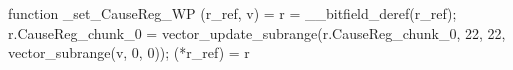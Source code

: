 function _set_CauseReg_WP (r_ref, v) = {
    r = __bitfield_deref(r_ref);
    r.CauseReg_chunk_0 = vector_update_subrange(r.CauseReg_chunk_0, 22, 22, vector_subrange(v, 0, 0));
    (*r_ref) = r
}
